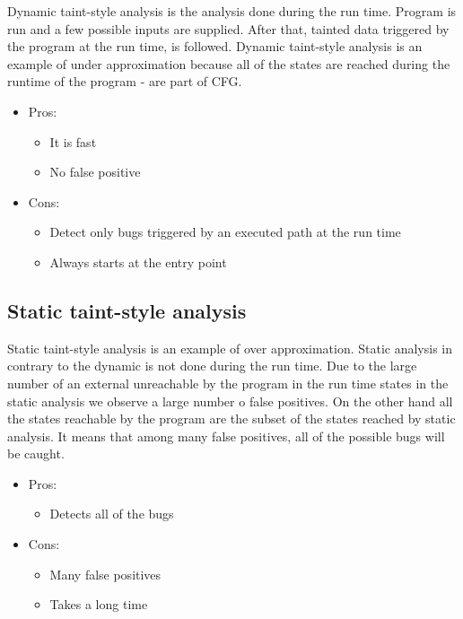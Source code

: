 \documentclass[a4paper, 12pt, journal, onecolumn]{IEEEtran}
\begin{document}
Dynamic taint-style analysis is the analysis done during the run time. Program is run and a few possible inputs are supplied. After that, tainted data triggered by the program at the run time, is followed. Dynamic taint-style analysis is an example of under approximation because all of the states are reached during the runtime of the program - are part of CFG. \cite{a6}\cite{a7}

\begin{itemize}
\item Pros:	

\begin{itemize}
\item It is fast	
\item No false positive
\end{itemize}

\item Cons:

\begin{itemize}
\item Detect only bugs triggered by an executed path at the run time
\item Always starts at the entry point
\end{itemize}

\end{itemize}

\subsection{Static taint-style analysis}

Static taint-style analysis is an example of over approximation. Static analysis in contrary to the dynamic is not done during the run time. Due to the large number of an external unreachable by the program in the run time states in the static analysis we observe a large number o false positives. On the other hand all the states reachable by the program are the subset of the states reached by static analysis. It means that among many false positives, all of the possible bugs will be caught. \cite{a5}\cite{a6}

\begin{itemize}
\item Pros:	

\begin{itemize}
\item Detects all of the bugs

\end{itemize}

\item Cons:

\begin{itemize}
\item Many false positives

\item Takes a long time
\end{itemize}

\end{itemize}
\end{document}
